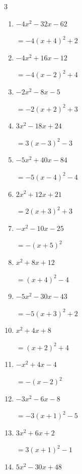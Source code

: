 \begin{multicols}{3}
\begin{enumerate}
        $=4\left( x+4\right)^{2}$

  \item $-4x^{2}-32x-62$

        $=-4\left( x+4\right)^{2}+2$

  \item $-4x^{2}+16x-12$

        $=-4\left( x-2\right)^{2}+4$

  \item $-2x^{2}-8x-5$

        $=-2\left( x+2\right)^{2}+3$

  \item $3x^{2}-18x+24$

        $=3\left( x-3\right)^{2}-3$

  \item $-5x^{2}+40x-84$

        $=-5\left( x-4\right)^{2}-4$

  \item $2x^{2}+12x+21$

        $=2\left( x+3\right)^{2}+3$

  \item $-x^{2}-10x-25$

        $=-\left( x+5\right)^{2}$

  \item $x^{2}+8x+12$

        $=\left( x+4\right)^{2}-4$

\columnbreak %

\resetques

  \item $-5x^{2}-30x-43$

        $=-5\left( x+3\right)^{2}+2$

  \item $x^{2}+4x+8$

        $=\left( x+2\right)^{2}+4$

  \item $-x^{2}+4x-4$

        $=-\left( x-2\right)^{2}$

  \item $-3x^{2}-6x-8$

        $=-3\left( x+1\right)^{2}-5$

  \item $3x^{2}+6x+2$

        $=3\left( x+1\right)^{2}-1$

  \item $5x^{2}-30x+48$


\end{enumerate}
\end{multicols}
